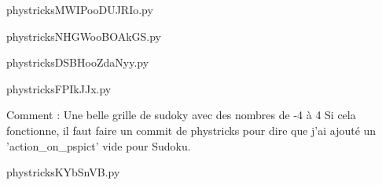     \newcommand{\CaptionFigMWIPooDUJRIo}{<+Type your caption here+>}
    \begin{center}
        
    \end{center}
    phystricksMWIPooDUJRIo.py

    

    \clearpage
    


    \newcommand{\CaptionFigNHGWooBOAkGS}{<+Type your caption here+>}
    \begin{center}
        
    \end{center}
    phystricksNHGWooBOAkGS.py

    

    \clearpage
    


    \newcommand{\CaptionFigDSBHooZdaNyy}{<+Type your caption here+>}
    \begin{center}
        
    \end{center}
    phystricksDSBHooZdaNyy.py

    

    \clearpage
    


    \newcommand{\CaptionFigFPIkJJx}{<+Type your caption here+>}
    \begin{center}
        
    \end{center}
    phystricksFPIkJJx.py

    Comment : Une belle grille de sudoky avec des nombres de -4 à 4 Si cela fonctionne, il faut faire un commit de phystricks pour dire que j'ai ajouté un 'action\_on\_pspict' vide pour Sudoku.

    \clearpage
    


    \newcommand{\CaptionFigKYbSnVB}{<+Type your caption here+>}
    \begin{center}
        
    \end{center}
    phystricksKYbSnVB.py

    

    \clearpage
    


